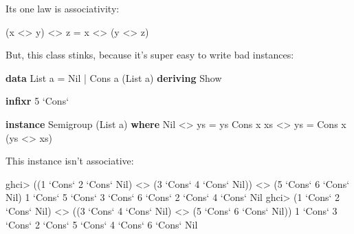 \documentclass[]{article}
\newenvironment{Shaded}{}{}
\newcommand{\DataTypeTok}[1]{\textcolor[rgb]{0.56,0.13,0.00}{#1}}
\newcommand{\DecValTok}[1]{\textcolor[rgb]{0.25,0.63,0.44}{#1}}
\newcommand{\FunctionTok}[1]{\textcolor[rgb]{0.02,0.16,0.49}{#1}}
\newcommand{\KeywordTok}[1]{\textcolor[rgb]{0.00,0.44,0.13}{\textbf{#1}}}
\newcommand{\NormalTok}[1]{#1}
\newcommand{\OtherTok}[1]{\textcolor[rgb]{0.00,0.44,0.13}{#1}}
\begin{document}
Its one law is associativity:

\begin{Shaded}
\begin{Highlighting}[]
\NormalTok{(x }\FunctionTok{<>}\NormalTok{ y) }\FunctionTok{<>}\NormalTok{ z }\FunctionTok{=}\NormalTok{ x }\FunctionTok{<>}\NormalTok{ (y }\FunctionTok{<>}\NormalTok{ z)}
\end{Highlighting}
\end{Shaded}

But, this class stinks, because it's super easy to write bad instances:

\begin{Shaded}
\begin{Highlighting}[]
\KeywordTok{data} \DataTypeTok{List}\NormalTok{ a }\FunctionTok{=} \DataTypeTok{Nil} \FunctionTok{|} \DataTypeTok{Cons}\NormalTok{ a (}\DataTypeTok{List}\NormalTok{ a)}
    \KeywordTok{deriving} \DataTypeTok{Show}

\KeywordTok{infixr} \DecValTok{5} \OtherTok{`Cons`}

\KeywordTok{instance} \DataTypeTok{Semigroup}\NormalTok{ (}\DataTypeTok{List}\NormalTok{ a) }\KeywordTok{where}
    \DataTypeTok{Nil}       \FunctionTok{<>}\NormalTok{ ys }\FunctionTok{=}\NormalTok{ ys}
    \DataTypeTok{Cons}\NormalTok{ x xs }\FunctionTok{<>}\NormalTok{ ys }\FunctionTok{=} \DataTypeTok{Cons}\NormalTok{ x (ys }\FunctionTok{<>}\NormalTok{ xs)}
\end{Highlighting}
\end{Shaded}

This instance isn't associative:

\begin{Shaded}
\begin{Highlighting}[]
\NormalTok{ghci}\FunctionTok{>}\NormalTok{ ((}\DecValTok{1} \OtherTok{`Cons`} \DecValTok{2} \OtherTok{`Cons`} \DataTypeTok{Nil}\NormalTok{) }\FunctionTok{<>}\NormalTok{ (}\DecValTok{3} \OtherTok{`Cons`} \DecValTok{4} \OtherTok{`Cons`} \DataTypeTok{Nil}\NormalTok{)) }\FunctionTok{<>}\NormalTok{ (}\DecValTok{5} \OtherTok{`Cons`} \DecValTok{6} \OtherTok{`Cons`} \DataTypeTok{Nil}\NormalTok{)}
\DecValTok{1} \OtherTok{`Cons`} \DecValTok{5} \OtherTok{`Cons`} \DecValTok{3} \OtherTok{`Cons`} \DecValTok{6} \OtherTok{`Cons`} \DecValTok{2} \OtherTok{`Cons`} \DecValTok{4} \OtherTok{`Cons`} \DataTypeTok{Nil}
\NormalTok{ghci}\FunctionTok{>}\NormalTok{ (}\DecValTok{1} \OtherTok{`Cons`} \DecValTok{2} \OtherTok{`Cons`} \DataTypeTok{Nil}\NormalTok{) }\FunctionTok{<>}\NormalTok{ ((}\DecValTok{3} \OtherTok{`Cons`} \DecValTok{4} \OtherTok{`Cons`} \DataTypeTok{Nil}\NormalTok{) }\FunctionTok{<>}\NormalTok{ (}\DecValTok{5} \OtherTok{`Cons`} \DecValTok{6} \OtherTok{`Cons`} \DataTypeTok{Nil}\NormalTok{))}
\DecValTok{1} \OtherTok{`Cons`} \DecValTok{3} \OtherTok{`Cons`} \DecValTok{2} \OtherTok{`Cons`} \DecValTok{5} \OtherTok{`Cons`} \DecValTok{4} \OtherTok{`Cons`} \DecValTok{6} \OtherTok{`Cons`} \DataTypeTok{Nil}
\end{Highlighting}
\end{Shaded}
\end{document}

